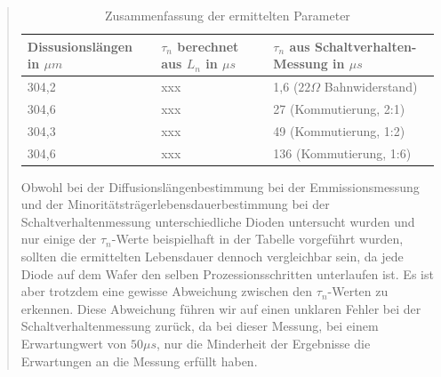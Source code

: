 \begin{quote}
    \begin{table}[H]
              \begin{addmargin}[-0.5cm]{3cm}
                \centering
                   \begin{tabular}{|p{5cm}|p{5cm}|p{5cm}|}
                    \hline
                    Dissusionslängen in $\mu m$ &  $\tau_n$ berechnet aus $L_n$
                    in $\mu s$ & $\tau_n$ aus Schaltverhalten-Messung in $\mu s$\\
                    \hline
                    304,2  & xxx &  1,6 ($22 \Omega$ Bahnwiderstand)\\
                    \hline
                    304,6  & xxx &  27 (Kommutierung, 2:1)\\
                    \hline
                    304,3  & xxx &  49 (Kommutierung, 1:2)\\
                    \hline
                    304,6  & xxx &  136 (Kommutierung, 1:6)\\
                    \hline

                    \end{tabular}
              \end{addmargin}
              \caption{Zusammenfassung der ermittelten Parameter}
              \label{tab:grossetab2}
            \end{table}
            
    Obwohl bei der Diffusionslängenbestimmung bei der Emmissionsmessung und der
    Minoritätsträgerlebensdauerbestimmung bei der Schaltverhaltenmessung
    unterschiedliche Dioden untersucht wurden und nur einige der $\tau_n$-Werte
    beispielhaft in der Tabelle vorgeführt wurden, sollten die ermittelten
    Lebensdauer dennoch vergleichbar sein, da jede Diode auf dem Wafer den
    selben Prozessionsschritten unterlaufen ist. Es ist aber trotzdem eine
    gewisse Abweichung zwischen den $\tau_n$-Werten zu erkennen. 
    Diese Abweichung führen wir auf einen unklaren Fehler bei der Schaltverhaltenmessung zurück, da
    bei dieser Messung, bei einem Erwartungwert von $50 \mu s$, nur die
    Minderheit der Ergebnisse die Erwartungen an die Messung erfüllt haben.
                
            
\end{quote}

\newpage

